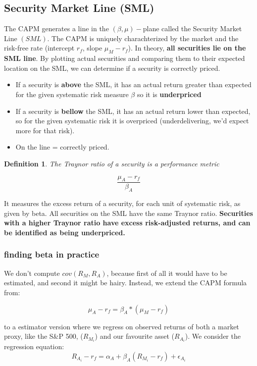 \documentclass{article}
\newtheorem{definition}{Definition}
\begin{document}
\subsection{Security Market Line (SML)}
The CAPM generates a line in the $(\beta, \mu)-$plane called the Security Market Line $(SML).$ The CAPM is uniquely charachterized by the market and the risk-free rate (intercept $r_f$, slope $\mu_M -r_f$). In theory, \textbf{all securities lie on the SML line}. By plotting actual securities and comparing them to their expected location on the SML, we can determine if a security is correctly priced. 
\begin{itemize}
\item If a security is \textbf{above} the SML, it has an actual return greater than expected for the given systematic risk measure $\beta$ so it is \textbf{underpriced}
\item If a security is \textbf{bellow} the SML, it has an actual return lower than expected, so for the given systematic risk it is overpriced (underdelivering, we'd expect more for that risk).
\item On the line = correctly priced. 
\end{itemize}

\begin{definition}
The Traynor ratio of a security is a performance metric 
\end{definition}
\[ \frac{\mu_A-r_f}{\beta_A}\]

It measures the excess return of a security, for each unit of systematic risk, as given by beta. All securities on the SML have the same Traynor ratio. \textbf{Securities with a higher Traynor ratio have excess risk-adjusted returns, and can be identified as being underpriced.}

\subsubsection{finding beta in practice}
We don't compute $cov(R_M, R_A)$, because first of all it would have to be estimated, and second it might be hairy. Instead, we extend the CAPM formula from:

\[ \mu_A - r_f = \beta_A*(\mu_M - r_f) \] 

to a estimator version where we regress on observed returns of both a market proxy, like the S\&P 500, ($R_{M_i}$) and our favourite asset ($R_{A_i}$). We consider the regression equation: 
\[ R_{A_i} - r_f = \alpha_A +  \beta_A (R_{M_i}-r_f) + \epsilon_{A_i} \]
\end{document}
